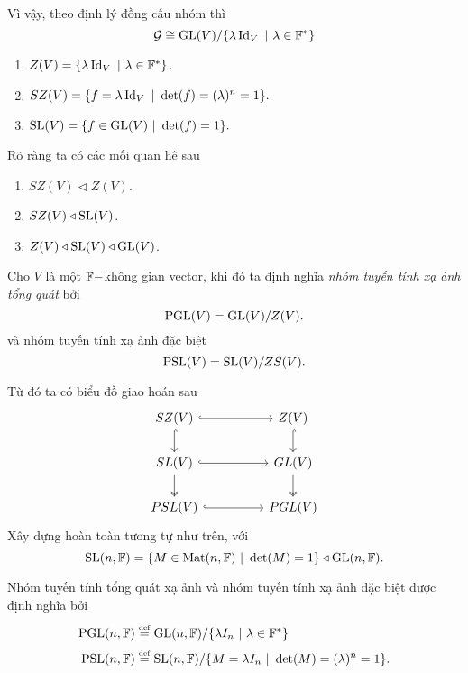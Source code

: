 Vì vậy, theo định lý đồng cấu nhóm thì
\[\mathcal{G} \cong \operatorname{GL}(V)/\{\lambda \operatorname{Id}_V~|~\lambda \in \mathbb{F}^*\}\]
\begin{defn}
    \begin{enumerate}
        \item $Z(V) = \{\lambda \operatorname{Id}_V~|~\lambda \in \mathbb{F}^*\}$.
        \item $SZ(V) = \{f = \lambda \operatorname{Id}_V~|~ \det(f) = (\lambda)^n = 1\}.$
        \item $\operatorname{SL}(V) = \{f \in \operatorname{GL}(V)~|~\det(f) =1\}.$
    \end{enumerate}
\end{defn}
\begin{comment*}
    Rõ ràng ta có các mối quan hê sau 
    \begin{enumerate}
        \item $SZ(V) \triangleleft Z(V)$.
        \item $SZ(V) \triangleleft \SL(V)$.
        \item $Z(V) \triangleleft \SL(V) \triangleleft \GL(V)$.
    \end{enumerate}
\end{comment*}
\begin{defn}
    Cho $V$ là một $\mathbb{F}-$không gian vector, khi đó ta định nghĩa \textit{nhóm tuyến tính xạ ảnh tổng quát} bởi
    \[\operatorname{PGL}(V) = \operatorname{GL}(V)/Z(V).\]
    và nhóm tuyến tính xạ ảnh đặc biệt 
    \[\operatorname{PSL}(V) = \operatorname{SL}(V)/ZS(V).\]
\end{defn}
 Từ đó ta có biểu đồ giao hoán sau
\[\begin{tikzcd}
	{SZ(V)} && {Z(V)} \\
	{SL(V)} && {GL(V)} \\
	{PSL(V)} && {PGL(V)}
	\arrow[hook, from=1-1, to=1-3]
	\arrow[hook, from=1-1, to=2-1]
	\arrow[hook, from=1-3, to=2-3]
	\arrow[hook, from=2-1, to=2-3]
	\arrow[two heads, from=2-1, to=3-1]
	\arrow[two heads, from=2-3, to=3-3]
	\arrow[hook, from=3-1, to=3-3]
\end{tikzcd}\]
Xây dựng hoàn toàn tương tự như trên, với 
\[\operatorname{SL}(n,\mathbb{F}) = \{M \in \operatorname{Mat}(n, \mathbb{F})~|~\det(M) = 1\} \triangleleft \operatorname{GL}(n,\mathbb{F}).\]
\begin{defn}
    Nhóm tuyến tính tổng quát xạ ảnh và nhóm tuyến tính xạ ảnh đặc biệt được định nghĩa bởi
    \begin{align*}
    \operatorname{PGL}(n,\mathbb{F}) &\overset{\underset{\mathrm{def}}{}}{=} \operatorname{GL}(n,\mathbb{F})/\{\lambda I_n~|~\lambda \in \mathbb{F}^*\}\\
    \operatorname{PSL}(n,\mathbb{F}) &\overset{\underset{\mathrm{def}}{}}{=} \operatorname{SL}(n,\mathbb{F})/\{M = \lambda I_n~|~\det(M) = (\lambda)^n =1\}.
    \end{align*}
\end{defn}
